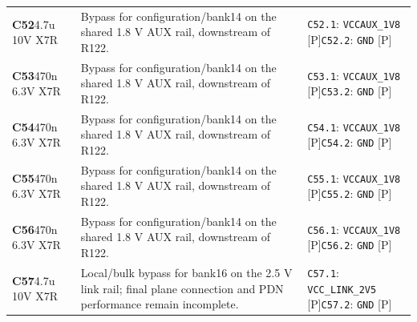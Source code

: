 \documentclass[11pt,a4paper]{article}
\begin{document}
\begin{longtable}{@{}P{27mm}P{83mm}P{58mm}@{}}
\textbf{C52}\newline 4.7u 10V X7R & Bypass for configuration/bank14 on the shared 1.8 V AUX rail, downstream of R122. & \nolinkurl{C52.1}: \nolinkurl{VCCAUX_1V8} [P]\newline \nolinkurl{C52.2}: \nolinkurl{GND} [P] \\
\textbf{C53}\newline 470n 6.3V X7R & Bypass for configuration/bank14 on the shared 1.8 V AUX rail, downstream of R122. & \nolinkurl{C53.1}: \nolinkurl{VCCAUX_1V8} [P]\newline \nolinkurl{C53.2}: \nolinkurl{GND} [P] \\
\textbf{C54}\newline 470n 6.3V X7R & Bypass for configuration/bank14 on the shared 1.8 V AUX rail, downstream of R122. & \nolinkurl{C54.1}: \nolinkurl{VCCAUX_1V8} [P]\newline \nolinkurl{C54.2}: \nolinkurl{GND} [P] \\
\textbf{C55}\newline 470n 6.3V X7R & Bypass for configuration/bank14 on the shared 1.8 V AUX rail, downstream of R122. & \nolinkurl{C55.1}: \nolinkurl{VCCAUX_1V8} [P]\newline \nolinkurl{C55.2}: \nolinkurl{GND} [P] \\
\textbf{C56}\newline 470n 6.3V X7R & Bypass for configuration/bank14 on the shared 1.8 V AUX rail, downstream of R122. & \nolinkurl{C56.1}: \nolinkurl{VCCAUX_1V8} [P]\newline \nolinkurl{C56.2}: \nolinkurl{GND} [P] \\
\textbf{C57}\newline 4.7u 10V X7R & Local/bulk bypass for bank16 on the 2.5 V link rail; final plane connection and PDN performance remain incomplete. & \nolinkurl{C57.1}: \nolinkurl{VCC_LINK_2V5} [P]\newline \nolinkurl{C57.2}: \nolinkurl{GND} [P] \\

\end{longtable}
\end{document}
